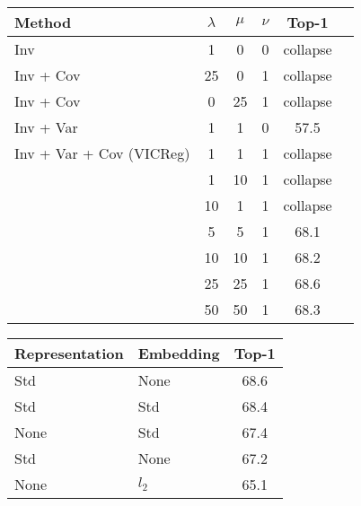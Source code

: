 \documentclass{article}
\newcommand{\algo}{VICReg}
\begin{document}
\def \hfillx {\hspace*{-\textwidth} \hfill}
\begin{table}[t]
\small
\begin{minipage}[c]{0.49\textwidth}
\centering
    \vspace{-1.5mm}
\label{tab:impact_varcov}
    \setlength\tabcolsep{3.5pt}
    \small
    \vspace{0.1mm}
    \begin{tabular}{lccccc}
    \toprule
    Method & $\lambda$ & $\mu$ & $\nu$ & Top-1  \\
    \midrule
    Inv                         & 1     & 0     & 0     & collapse \\
    Inv + Cov                   & 25    & 0     & 1     & collapse \\
    Inv + Cov                   & 0     & 25    & 1     & collapse \\
    Inv + Var                   & 1     & 1     & 0     & 57.5 \\
    \midrule
    Inv + Var + Cov (\algo)     & 1     & 1	    & 1	    & collapse \\
                                & 1	    & 10	& 1	    & collapse \\
                                & 10	& 1	    & 1	    & collapse \\
                                & 5	    & 5	    & 1	    & 68.1 \\
                                & 10	& 10	& 1	    & 68.2 \\
                                & 25    & 25    & 1     & 68.6 \\
                                & 50	& 50	& 1	    & 68.3 \\
    \bottomrule
    \end{tabular}
\end{minipage}
\hfillx
\begin{minipage}[c]{0.49\textwidth}
\centering
    \vspace{-1.5mm}
    \label{tab:impact_norm}
    \small
    \begin{tabular}{llc}
    \toprule
    Representation & Embedding & Top-1  \\
    \midrule
Std  & None  & 68.6 \\
    Std  & Std & 68.4 \\
    None & Std  & 67.4 \\
    Std & None & 67.2 \\
    None  & $l_2$ & 65.1 \\
    \bottomrule
    \end{tabular}
\end{minipage}
\end{table}
\end{document}
